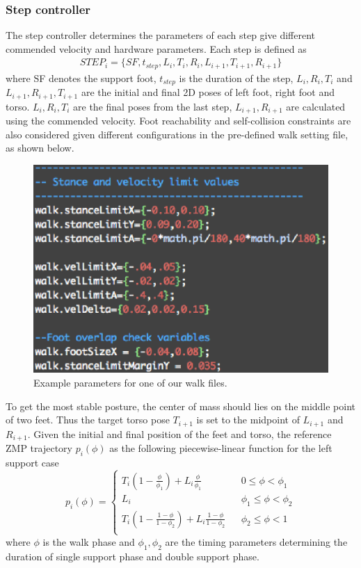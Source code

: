 \documentclass{article}
\begin{document}
\subsubsection{Step controller}
The step controller determines the parameters of each step give different commended velocity and hardware parameters. Each step is defined as 
\begin{eqnarray*}
STEP_i=\{SF,t_{step},L_i,T_i,R_i,L_{i+1},T_{i+1},R_{i+1}\}
\end{eqnarray*}
where SF denotes the support foot, $t_{step}$ is the duration of the step, $L_i,R_i,T_i$ and $L_{i+1},R_{i+1},T_{i+1}$ are the initial and final 2D poses of left foot, right foot and torso. $L_i,R_i,T_i$ are the final poses from the last step, $L_{i+1},R_{i+1}$ are calculated using the commended velocity. Foot reachability and self-collision constraints are also considered given different configurations in the pre-defined walk setting file, as shown below.
\begin{figure}[H]
		\centering
		\includegraphics[width=.60\textwidth]{figures/WalkFile.eps}
		\caption{Example parameters for one of our walk files.}
	\end{figure}
To get the most stable posture, the center of mass should lies on the middle point of two feet. Thus the target torso pose $T_{i+1}$ is set to the midpoint of $L_{i+1}$ and $R_{i+1}$.
Given the initial and final position of the feet and torso, the reference ZMP trajectory $p_i(\phi)$ as the following piecewise-linear function for the left support case
$$ p_i(\phi)=\left\{
\begin{array}{rcl}
T_i(1-\frac{\phi}{\phi_1})+L_i \frac{\phi}{\phi_1} & & 0 \leq \phi < \phi_1\\
L_i & & \phi_1 \leq \phi < \phi_2\\
T_i(1-\frac{1-\phi}{1-\phi_2})+L_i \frac{1-\phi}{1-\phi_2} & & \phi_2 \leq \phi < 1\\
\end{array} \right. $$
where $\phi$ is the walk phase and $\phi_1,\phi_2$ are the timing parameters determining the duration of single support phase and double support phase.
\end{document}
